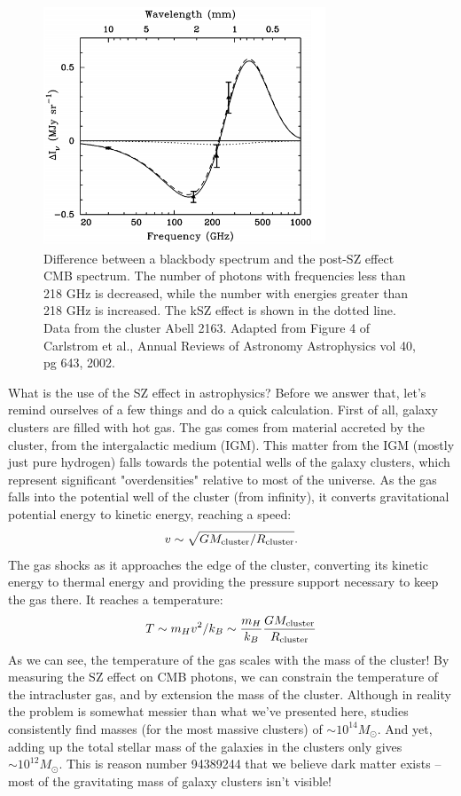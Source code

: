 \documentclass{article}
\begin{document}
\begin{figure}
    \centering
    \includegraphics[width=0.75\textwidth]{CarlstromFig4.png}
    \caption{Difference between a blackbody spectrum and the post-SZ effect CMB spectrum. The number of photons with frequencies less than 218 GHz is decreased, while the number with energies greater than 218 GHz is increased. The kSZ effect is shown in the dotted line. Data from the cluster Abell 2163. Adapted from Figure 4 of Carlstrom et al., Annual Reviews of Astronomy Astrophysics vol 40, pg 643, 2002.}
    \label{fig:carlstrom4}
\end{figure}

What is the use of the SZ effect in astrophysics? Before we answer that, let's remind ourselves of a few things and do a quick calculation. First of all, galaxy clusters are filled with hot gas. The gas comes from material accreted by the cluster, from the intergalactic medium (IGM). This matter from the IGM (mostly just pure hydrogen) falls towards the potential wells of the galaxy clusters, which represent significant "overdensities" relative to most of the universe. As the gas falls into the potential well of the cluster (from infinity), it converts gravitational potential energy to kinetic energy, reaching a speed:
\begin{equation}
v \sim \sqrt{GM_{\rm cluster}/{R_{\rm cluster}}}.
\end{equation}
The gas shocks as it approaches the edge of the cluster, converting its kinetic energy to thermal energy and providing the pressure support necessary to keep the gas there. It reaches a temperature:
\begin{equation}
T \sim m_H v^2/k_B \sim \frac{m_H}{k_B}\frac{GM_{\rm cluster}}{R_{\rm cluster}}
\end{equation}
As we can see, the temperature of the gas scales with the mass of the cluster! By measuring the SZ effect on CMB photons, we can constrain the temperature of the intracluster gas, and by extension the mass of the cluster. Although in reality the problem is somewhat messier than what we've presented here, studies consistently find masses (for the most massive clusters) of $\sim 10^{14} M_{\odot}$. And yet, adding up the total stellar mass of the galaxies in the clusters only gives $\sim 10^{12} M_{\odot}$. This is reason number 94389244 that we believe dark matter exists -- most of the gravitating mass of galaxy clusters isn't visible!
\end{document}
